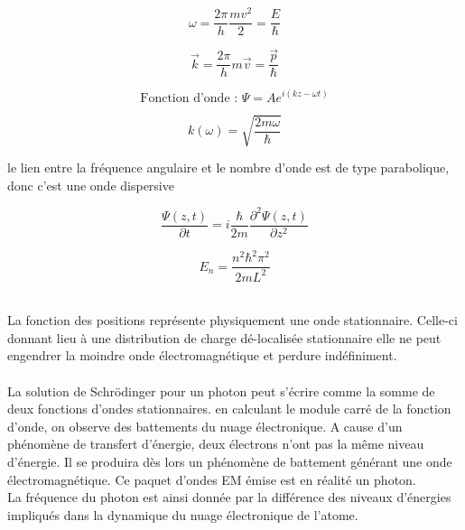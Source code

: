 \documentclass[british,french,11pt, a4paper, openany]{book}
\begin{document}
		$$ \omega = \dfrac{2\pi}{h}\dfrac{mv^2}{2} = \dfrac{E}{\hbar} $$
		
		$$ \vec k = \dfrac{2\pi}{h}m\vec v = \dfrac{\vec p}{\hbar} $$
		
		$$ \text{Fonction d'onde : } \Psi = Ae^{i(kz-\omega t)} $$
		
		
		$$ k(\omega) = \sqrt{\dfrac{2m\omega}{\hbar}} $$
		
		
		le lien entre la fréquence angulaire et le
		nombre d'onde est de type parabolique, donc c'est une onde dispersive
		
		
		$$ \dfrac{ \Psi(z,t)}{\partial t} = i\dfrac{\hbar}{2m}\dfrac{\partial^2\Psi(z,t)}{\partial z^2} $$
		
		
		$$ E_n = \dfrac{n^2\hbar^2\pi^2}{2mL^2} $$
		
		\ \\ La fonction des positions représente physiquement une onde stationnaire. Celle-ci donnant lieu à une distribution de charge dé-localisée stationnaire elle ne peut engendrer la moindre onde électromagnétique et perdure indéfiniment.\\
		
		\ \\ La solution de Schrödinger pour un photon peut s'écrire comme la somme de deux fonctions d'ondes stationnaires. en calculant le module carré de la fonction d'onde, on observe des battements du nuage électronique. A cause d'un phénomène de transfert d'énergie, deux électrons n'ont pas la même niveau d'énergie. Il se produira dès lors un phénomène de battement générant une onde électromagnétique. Ce paquet d'ondes EM émise est en réalité un photon.\\
		La fréquence du photon est ainsi donnée par la différence des niveaux d'énergies impliqués dans la dynamique du nuage électronique de l'atome.
		
\end{document}
